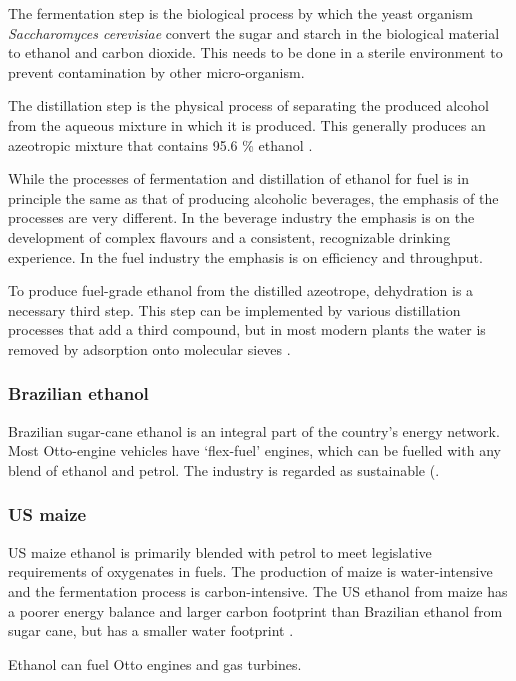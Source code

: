 The fermentation step is the biological process by which the yeast organism
\textit{Saccharomyces cerevisiae} convert the sugar and starch in the biological
material to ethanol and carbon dioxide. This needs to be done in a sterile
environment to prevent contamination by other micro-organism.

The distillation step is the physical process of separating the produced alcohol
from the aqueous mixture in which it is produced. This generally produces an
azeotropic mixture that contains 95.6 \% ethanol \autocite{Kumar2010}.

While the processes of fermentation and distillation of ethanol for fuel is in
principle the same as that of producing alcoholic beverages, the emphasis of the
processes are very different. In the beverage industry the emphasis is on the
development of complex flavours and a consistent, recognizable drinking 
experience. In the fuel industry the emphasis is on efficiency and throughput.

To produce fuel-grade ethanol from the distilled azeotrope, dehydration is a
necessary third step. This step can be implemented by various distillation
processes that add a third compound, but in most modern plants the water is
removed by adsorption onto molecular sieves \autocite{Kumar2010}.

\subsubsection{Brazilian ethanol}

Brazilian sugar-cane ethanol is an integral part of the country's energy
network. Most Otto-engine vehicles have `flex-fuel' engines, which can be
fuelled with any blend of ethanol and petrol. The industry is regarded as
sustainable (\autocite{Smeets2006}.

\subsubsection{US maize}

US maize ethanol is primarily blended with petrol to meet legislative
requirements of oxygenates in fuels. The production of maize is water-intensive
and the fermentation process is carbon-intensive. The US ethanol from maize has
a poorer energy balance and larger carbon footprint than Brazilian ethanol from
sugar cane, but has a smaller water footprint \autocite{Mekonnen2018}.

Ethanol can fuel Otto engines and gas turbines. 

